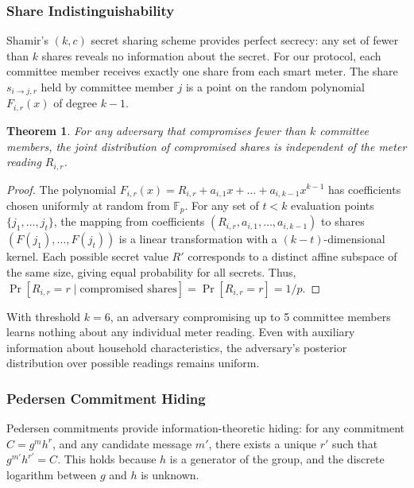 \documentclass[conference]{IEEEtran}
\newtheorem{theorem}{Theorem}
\begin{document}
\subsubsection{Share Indistinguishability}

Shamir's \((k,c)\) secret sharing scheme \cite{shamir1979how} provides perfect secrecy: any set of fewer than \(k\) shares reveals no information about the secret. For our protocol, each committee member receives exactly one share from each smart meter. The share \(s_{i \to j,r}\) held by committee member \(j\) is a point on the random polynomial \(F_{i,r}(x)\) of degree \(k-1\).

\begin{theorem}
For any adversary that compromises fewer than \(k\) committee members, the joint distribution of compromised shares is independent of the meter reading \(R_{i,r}\).
\end{theorem}

\begin{proof}
The polynomial \(F_{i,r}(x) = R_{i,r} + a_{i,1}x + \ldots + a_{i,k-1}x^{k-1}\) has coefficients chosen uniformly at random from \(\mathbb{F}_p\). For any set of \(t < k\) evaluation points \(\{j_1, \ldots, j_t\}\), the mapping from coefficients \((R_{i,r}, a_{i,1}, \ldots, a_{i,k-1})\) to shares \((F(j_1), \ldots, F(j_t))\) is a linear transformation with a \((k-t)\)-dimensional kernel. Each possible secret value \(R'\) corresponds to a distinct affine subspace of the same size, giving equal probability for all secrets. Thus, \(\Pr[R_{i,r} = r \mid \text{compromised shares}] = \Pr[R_{i,r} = r] = 1/p\).
\end{proof}

With threshold \(k = 6\), an adversary compromising up to 5 committee members learns nothing about any individual meter reading. Even with auxiliary information about household characteristics, the adversary's posterior distribution over possible readings remains uniform.

\subsubsection{Pedersen Commitment Hiding}

Pedersen commitments \cite{pedersen1991non} provide information-theoretic hiding: for any commitment \(C = g^m h^r\), and any candidate message \(m'\), there exists a unique \(r'\) such that \(g^{m'} h^{r'} = C\). This holds because \(h\) is a generator of the group, and the discrete logarithm between \(g\) and \(h\) is unknown.
\end{document}

